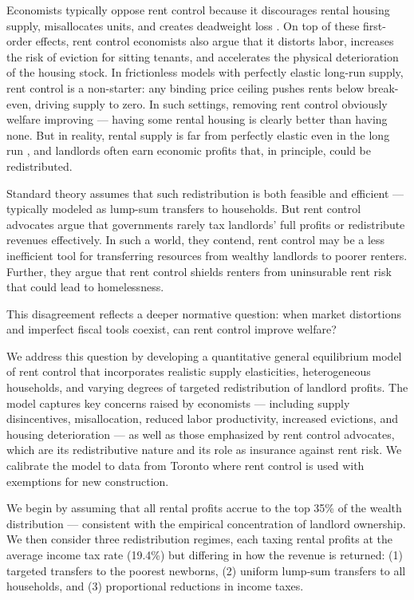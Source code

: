 \documentclass[parskip=full]{article}
\begin{document}
Economists typically oppose rent control because it discourages rental housing supply, misallocates units, and creates deadweight loss \citep{gl-2003}. On top of these first-order effects, rent control economists also argue that it distorts labor, increases the risk of eviction for sitting tenants, and accelerates the physical deterioration of the housing stock. In frictionless models with perfectly elastic long-run supply, rent control is a non-starter: any binding price ceiling pushes rents below break-even, driving supply to zero. In such settings, removing rent control obviously welfare improving — having some rental housing is clearly better than having none. But in reality, rental supply is far from perfectly elastic even in the long run \citep{cy-1994,susin-2002,fack-2006,sy-2020,rs-2023}, and landlords often earn economic profits that, in principle, could be redistributed.

Standard theory assumes that such redistribution is both feasible and efficient — typically modeled as lump-sum transfers to households. But rent control advocates argue that governments rarely tax landlords’ full profits or redistribute revenues effectively. In such a world, they contend, rent control may be a less inefficient tool for transferring resources from wealthy landlords to poorer renters. Further, they argue that rent control shields renters from uninsurable rent risk that could lead to homelessness. 

This disagreement reflects a deeper normative question: when market distortions and imperfect fiscal tools coexist, can rent control improve welfare?

We address this question by developing a quantitative general equilibrium model of rent control that incorporates realistic supply elasticities, heterogeneous households, and varying degrees of targeted redistribution of landlord profits. The model captures key concerns raised by economists — including supply disincentives, misallocation, reduced labor productivity, increased evictions, and housing deterioration — as well as those emphasized by rent control advocates, which are its redistributive nature and its role as insurance against rent risk. We calibrate the model to data from Toronto where rent control is used with exemptions for new construction.

We begin by assuming that all rental profits accrue to the top 35\% of the wealth distribution — consistent with the empirical concentration of landlord ownership. We then consider three redistribution regimes, each taxing rental profits at the average income tax rate (19.4\%) but differing in how the revenue is returned: (1) targeted transfers to the poorest newborns, (2) uniform lump-sum transfers to all households, and (3) proportional reductions in income taxes.
\end{document}
